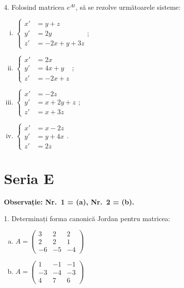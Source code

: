 4. Folosind matricea $ e^{At} $, să se rezolve următoarele sisteme:
\begin{enumerate}[(i)]
  \item $ \begin{cases}
      x' &= y + z \\
      y' &= 2y \\
      z' &= -2x + y + 3z
    \end{cases} $;
  \item $ \begin{cases}
      x' &= 2x \\
      y' &= 4x + y \\
      z' &= -2x + z
    \end{cases};
    $
  \item $ \begin{cases}
      x' &= -2z \\
      y' &= x + 2y + z \\
      z' &= x + 3z
    \end{cases} $;
  \item $ \begin{cases}
      x' &= x - 2z \\
      y' &= y + 4x \\
      z' &= 2z
    \end{cases} $.
\end{enumerate}


\section{Seria E}


\textbf{Observație: Nr.\ 1 = (a), Nr.\ 2 = (b).}

1. Determinați forma canonică Jordan pentru matricea:
\begin{enumerate}[(a)]
  \item $ A = \begin{pmatrix}
      3 & 2 & 2 \\
      2 & 2 & 1 \\
      -6 & -5 & -4
    \end{pmatrix}
    $
  \item $ A = \begin{pmatrix}
      1 & -1 & -1 \\
      -3 & -4 & -3 \\
      4 & 7 & 6
    \end{pmatrix}
    $
\end{enumerate}

